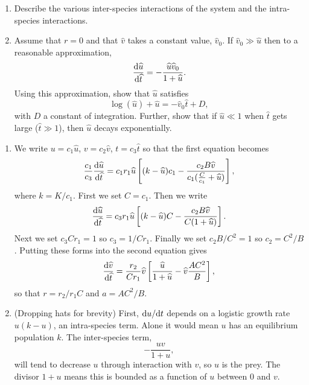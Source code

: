 \documentclass[a4paper, 12pt]{article}
\begin{document}
\begin{enumerate}[label={\bf \arabic{*}.\;}, ref={\arabic{*}},itemsep=3ex, left=0ex]
{\begin{enumerate}[label=(\alph*)]
        \item Describe the various inter-species interactions of the system and the intra-species interactions.

        \item
          Assume that $r=0$  and that $\hat{v}$ takes a constant value, $\hat{v}_0$. If $\hat{v}_0 \gg \hat{u}$ then to a reasonable approximation,
          \begin{equation}
            \fd{\hat{u}}{\hat{t}} = -\frac{\hat{u}\hat{v}_0}{1+\hat{u}}.
          \end{equation}
          Using this approximation, show that $\hat{u}$ satisfies
          \begin{equation}
            \log(\hat{u}) + \hat{u}= -\hat{v}_0\hat{t} +D,
          \end{equation}
          with $D$ a constant of integration. Further, show that if $\hat{u}\ll 1$ when $\hat{t}$ gets large ($\hat{t}\gg1$), then $\hat{u}$ decays exponentially.

      \end{enumerate}
    }
    {
      \begin{enumerate}[label=(\alph*)]
        \item{
            We write $u=c_1\hat{u}$, $v=c_2\hat{v}$, $t = c_3\hat{t}$ so that the first equation becomes
            \begin{equation}
              \frac{c_1}{c_3}\fd{\hat{u}}{\hat{t}} = c_1r_1\hat{u}\left[(k-\hat{u})c_1 - \frac{c_2 B\hat{v}}{c_1(\frac{C}{c_1}+\hat{u})}\right],
            \end{equation}
            where $k =K/c_1$.
            First we set $C=c_1$. Then we write
            \begin{equation}
              \fd{\hat{u}}{\hat{t}} = c_3r_1\hat{u}\left[(k-\hat{u})C - \frac{c_2 B\hat{v}}{C(1+\hat{u})}\right].
            \end{equation}
            Next we set $c_3C r_1 =1$ so $c_3 = 1/C r_1$. Finally we set $c_2B/C^2 = 1$ so $c_2= C^2/B$. Putting these forms into the second equation gives
            \begin{equation}
              \fd{\hat{v}}{\hat{t}} = \frac{r_2}{C r_1}\hat{v}\left[\frac{\hat{u}}{1+\hat{u}}- \hat{v}\frac{AC^2}{B}\right],
            \end{equation}
            so that $r = r_2/r_1C$ and $a= AC^2/B$.
          }
        \item{
            (Dropping hats for brevity) First, $\fd{u}{t}$ depends on a logistic growth rate $u(k-u)$, an intra-species term. Alone it would mean $u$ has an equilibrium population $k$. The inter-species term,
            \begin{equation}
              -\frac{uv}{1+u},
            \end{equation}
            will tend to decrease $u$ through interaction with $v$, so $u$ is the prey. The divisor $1+u$ means this is bounded as a function of $u$ between $0$ and $v$.

}
\end{enumerate}}
\end{enumerate}
\end{document}
